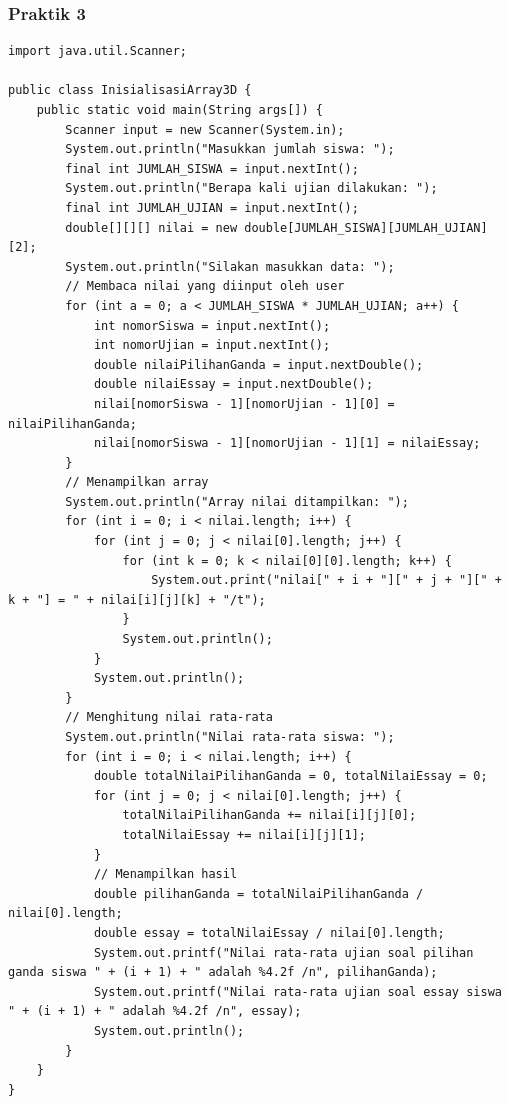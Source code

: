 \documentclass[a4paper,12pt]{article}
\begin{document}
\subsubsection{Praktik 3}
\begin{lstlisting}
import java.util.Scanner;

public class InisialisasiArray3D {
    public static void main(String args[]) {
        Scanner input = new Scanner(System.in);
        System.out.println("Masukkan jumlah siswa: ");
        final int JUMLAH_SISWA = input.nextInt();
        System.out.println("Berapa kali ujian dilakukan: ");
        final int JUMLAH_UJIAN = input.nextInt();
        double[][][] nilai = new double[JUMLAH_SISWA][JUMLAH_UJIAN][2];
        System.out.println("Silakan masukkan data: ");
        // Membaca nilai yang diinput oleh user
        for (int a = 0; a < JUMLAH_SISWA * JUMLAH_UJIAN; a++) {
            int nomorSiswa = input.nextInt();
            int nomorUjian = input.nextInt();
            double nilaiPilihanGanda = input.nextDouble();
            double nilaiEssay = input.nextDouble();
            nilai[nomorSiswa - 1][nomorUjian - 1][0] = nilaiPilihanGanda;
            nilai[nomorSiswa - 1][nomorUjian - 1][1] = nilaiEssay;
        }
        // Menampilkan array
        System.out.println("Array nilai ditampilkan: ");
        for (int i = 0; i < nilai.length; i++) {
            for (int j = 0; j < nilai[0].length; j++) {
                for (int k = 0; k < nilai[0][0].length; k++) {
                    System.out.print("nilai[" + i + "][" + j + "][" + k + "] = " + nilai[i][j][k] + "/t");
                }
                System.out.println();
            }
            System.out.println();
        }
        // Menghitung nilai rata-rata
        System.out.println("Nilai rata-rata siswa: ");
        for (int i = 0; i < nilai.length; i++) {
            double totalNilaiPilihanGanda = 0, totalNilaiEssay = 0;
            for (int j = 0; j < nilai[0].length; j++) {
                totalNilaiPilihanGanda += nilai[i][j][0];
                totalNilaiEssay += nilai[i][j][1];
            }
            // Menampilkan hasil
            double pilihanGanda = totalNilaiPilihanGanda / nilai[0].length;
            double essay = totalNilaiEssay / nilai[0].length;
            System.out.printf("Nilai rata-rata ujian soal pilihan ganda siswa " + (i + 1) + " adalah %4.2f /n", pilihanGanda);
            System.out.printf("Nilai rata-rata ujian soal essay siswa " + (i + 1) + " adalah %4.2f /n", essay);
            System.out.println();
        }
    }
}
\end{lstlisting}
\end{document}
